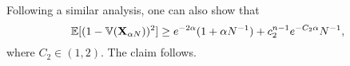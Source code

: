 Following a similar analysis, one can also show that
    \[
         {\mathbb{E}}[(1- \mathbb{V}(\mathbf{X}_{\alpha N}))^2] \geq e^{-2\alpha}(1+\alpha N^{-1}) + c_2^{n-1} e^{-C_2\alpha} N^{-1},
    \]
    where $C_2 \in (1,2)$.
    The claim follows.

